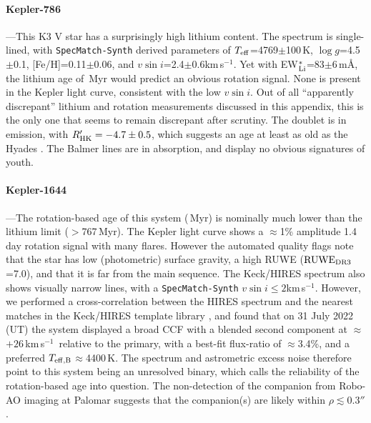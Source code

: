 \documentclass[11pt,twocolumn,tighten,linenumbers,trackchanges]{aastex63}
\newcommand{\kms}{{km\,s$^{-1}$}}
\begin{document}


\paragraph{Kepler-786}---This K3 V star has a surprisingly high
lithium content.  The spectrum is single-lined, with
\texttt{SpecMatch-Synth} derived parameters of $T_{\rm
eff}$=4769$\pm$100\,K, $\log g$=4.5$\pm$0.1, [Fe/H]=0.11$\pm$0.06, and
$v\sin i$=2.4$\pm$0.6\kms.  Yet with EW$_{\rm
Li}^{\ast}$=83$\pm$6\,m\AA, the lithium age of \kepseveneightsix\,Myr
would predict an obvious rotation signal.  None is present in the
Kepler light curve, consistent with the low $v\sin i$.  Out of all
``apparently discrepant'' lithium and rotation measurements discussed
in this appendix, this is the only one that seems to remain discrepant
after scrutiny.  The   doublet is in emission, with
$R'_{\rm HK}=-4.7\pm0.5$, which suggests an age at least as old as the
Hyades \citep{Mamajek_2008}.  The Balmer lines are in absorption, and
display no obvious signatures of youth.


\paragraph{Kepler-1644}---The rotation-based age of this system
(\kepsixteenfourfour\,Myr) is nominally much lower than the lithium
limit ($>$767\,Myr).  The Kepler light curve shows a $\approx$1\%
amplitude 1.4\,day rotation signal with many flares.  However the
automated quality flags note that the star has low (photometric)
surface gravity, a high RUWE (${\rm RUWE}_{\rm DR3}$=7.0), and that it
is far from the main sequence.  The Keck/HIRES spectrum also shows
visually narrow lines, with a \texttt{SpecMatch-Synth} $v \sin i \leq
2$\kms.  However, we performed a cross-correlation between the HIRES
spectrum and the nearest matches in the Keck/HIRES template library
\citep{2015AJ....149...18K}, and found that on 31 July 2022 (UT) the
system displayed a broad CCF with a blended second component at
$\approx$$+26$\,\kms\ relative to the primary, with a best-fit
flux-ratio of $\approx$3.4\%, and a preferred $T_{\rm
eff,B}$$\approx$4400\,K.  The spectrum and astrometric excess noise
therefore point to this system being an unresolved binary, which calls
the reliability of the rotation-based age into question.  The
non-detection of the companion from Robo-AO imaging at Palomar
\citep{2017AJ....153...66Z} suggests that the companion(s) are likely
within $\rho$$\lesssim$0.3$''$.
\end{document}
